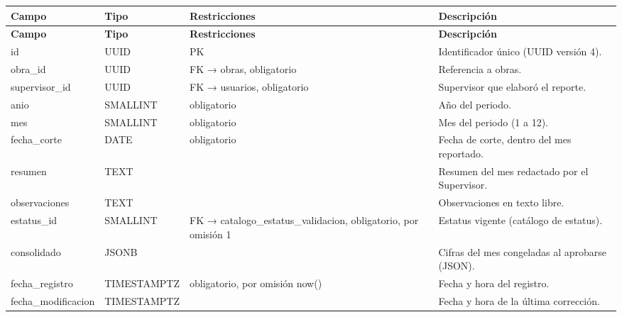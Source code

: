 \begin{xltabular}{\linewidth}{@{}>{\ttfamily\footnotesize}p{4.9cm}>{\ttfamily\footnotesize}p{2.4cm}>{\raggedright\arraybackslash\footnotesize}p{3.3cm}>{\footnotesize}X@{}}
\toprule\normalfont\sffamily\bfseries\footnotesize Campo & \normalfont\sffamily\bfseries\footnotesize Tipo & \sffamily\bfseries Restricciones & \sffamily\bfseries Descripción\\\midrule\endfirsthead
\toprule\normalfont\sffamily\bfseries\footnotesize Campo & \normalfont\sffamily\bfseries\footnotesize Tipo & \sffamily\bfseries Restricciones & \sffamily\bfseries Descripción\\\midrule\endhead
\bottomrule\endfoot
id & UUID & PK & Identificador único (UUID versión 4).\\
obra\_id & UUID & FK → obras, obligatorio & Referencia a obras.\\
supervisor\_id & UUID & FK → usuarios, obligatorio & Supervisor que elaboró el reporte.\\
anio & SMALLINT & obligatorio & Año del periodo.\\
mes & SMALLINT & obligatorio & Mes del periodo (1 a 12).\\
fecha\_corte & DATE & obligatorio & Fecha de corte, dentro del mes reportado.\\
resumen & TEXT &  & Resumen del mes redactado por el Supervisor.\\
observaciones & TEXT &  & Observaciones en texto libre.\\
estatus\_id & SMALLINT & FK → catalogo\_estatus\_validacion, obligatorio, por omisión 1 & Estatus vigente (catálogo de estatus).\\
consolidado & JSONB &  & Cifras del mes congeladas al aprobarse (JSON).\\
fecha\_registro & TIMESTAMPTZ & obligatorio, por omisión now() & Fecha y hora del registro.\\
fecha\_modificacion & TIMESTAMPTZ &  & Fecha y hora de la última corrección.\\
\end{xltabular}

